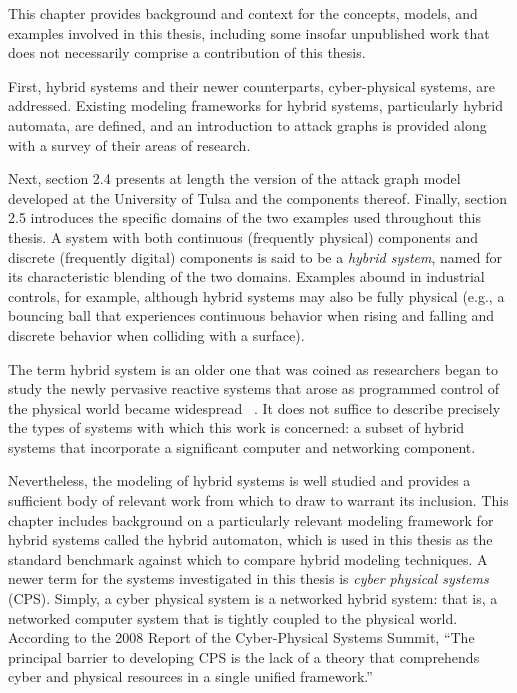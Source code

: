 This chapter provides background and context for the concepts, models, 
and examples involved in this thesis, including some insofar unpublished work
that does not necessarily comprise a contribution of this thesis. 

First, hybrid systems
and their newer counterparts, cyber-physical systems, are addressed. Existing
modeling frameworks for hybrid systems, particularly hybrid automata, are
defined, and an introduction to attack graphs is provided along with a
survey of their areas of research.

Next, section 2.4 presents at length the version of the attack graph model 
developed at the University of Tulsa and the components thereof. 
Finally, section 2.5 introduces the specific
domains of the two examples used throughout this thesis.
A system with both continuous (frequently physical) components and discrete (frequently digital)
components is said to be a \emph{hybrid system}, named for its characteristic blending of the
two domains. Examples abound in industrial controls, for example,
although hybrid systems may also be fully physical (e.g., a bouncing ball that experiences continuous
behavior when rising and falling and discrete behavior when colliding with a surface).

The term hybrid system is an older one that was coined as researchers began to study the newly
pervasive reactive systems that arose as programmed control of the physical world became 
widespread ~\cite{alur1993hybrid}. It does not suffice to describe precisely
the types of systems with which this work is concerned: a subset of hybrid
systems that incorporate a significant computer and networking component.

Nevertheless, the modeling of hybrid systems is well studied and provides a sufficient body
of relevant work from which to draw to warrant its inclusion. This chapter includes
background on a particularly relevant modeling framework for hybrid systems called the
hybrid automaton, which is used in this thesis as the standard benchmark against which to
compare hybrid modeling techniques.
A newer term for the systems investigated in this thesis is \emph{cyber physical systems}
 (CPS).
Simply, a cyber physical system is a networked hybrid system: that is, a 
networked computer system that is tightly coupled to the physical world.
According to the 2008 Report of the Cyber-Physical Systems Summit, ``The principal barrier to 
developing CPS is the lack of a theory that comprehends cyber and physical resources in a 
single unified framework.''~\cite{summitreport2008}

